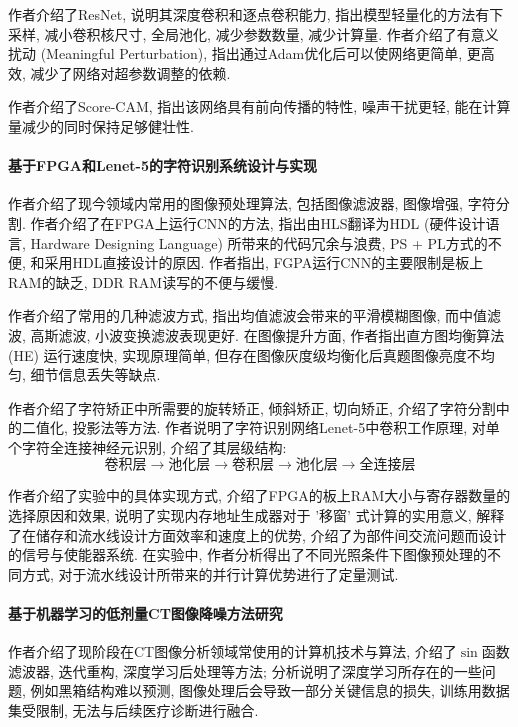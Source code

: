 \documentclass[]{ctexart}
\begin{document}
	作者介绍了ResNet, 说明其深度卷积和逐点卷积能力, 指出模型轻量化的方法有下采样, 减小卷积核尺寸, 全局池化, 减少参数数量, 减少计算量. 作者介绍了有意义扰动 (Meaningful Perturbation), 指出通过Adam优化后可以使网络更简单, 更高效, 减少了网络对超参数调整的依赖. 
	
	作者介绍了Score-CAM, 指出该网络具有前向传播的特性, 噪声干扰更轻, 能在计算量减少的同时保持足够健壮性. 
	
\paragraph{基于FPGA和Lenet-5的字符识别系统设计与实现\cite{lenet-5}} 作者介绍了现今领域内常用的图像预处理算法, 包括图像滤波器, 图像增强, 字符分割. 作者介绍了在FPGA上运行CNN的方法, 指出由HLS翻译为HDL (硬件设计语言, Hardware Designing Language) 所带来的代码冗余与浪费, PS + PL方式的不便, 和采用HDL直接设计的原因. 作者指出, FGPA运行CNN的主要限制是板上RAM的缺乏, DDR RAM读写的不便与缓慢. 

	作者介绍了常用的几种滤波方式, 指出均值滤波会带来的平滑模糊图像, 而中值滤波, 高斯滤波, 小波变换滤波表现更好. 在图像提升方面, 作者指出直方图均衡算法 (HE) 运行速度快, 实现原理简单, 但存在图像灰度级均衡化后真题图像亮度不均匀, 细节信息丢失等缺点. 
	
	作者介绍了字符矫正中所需要的旋转矫正, 倾斜矫正, 切向矫正, 介绍了字符分割中的二值化, 投影法等方法. 作者说明了字符识别网络Lenet-5中卷积工作原理, 对单个字符全连接神经元识别, 介绍了其层级结构:
	$$
		\text {卷积层}
		\rightarrow
		\text {池化层}
		\rightarrow
		\text {卷积层}
		\rightarrow
		\text {池化层}
		\rightarrow
		\text {全连接层}
	$$
	
	作者介绍了实验中的具体实现方式, 介绍了FPGA的板上RAM大小与寄存器数量的选择原因和效果, 说明了实现内存地址生成器对于 '移窗' 式计算的实用意义, 解释了在储存和流水线设计方面效率和速度上的优势, 介绍了为部件间交流问题而设计的信号与使能器系统. 在实验中, 作者分析得出了不同光照条件下图像预处理的不同方式, 对于流水线设计所带来的并行计算优势进行了定量测试. 
	
\paragraph{基于机器学习的低剂量CT图像降噪方法研究\cite{ctDenoise}} 作者介绍了现阶段在CT图像分析领域常使用的计算机技术与算法, 介绍了$\sin$函数滤波器, 迭代重构, 深度学习后处理等方法; 分析说明了深度学习所存在的一些问题, 例如黑箱结构难以预测, 图像处理后会导致一部分关键信息的损失, 训练用数据集受限制, 无法与后续医疗诊断进行融合. 
\end{document}
